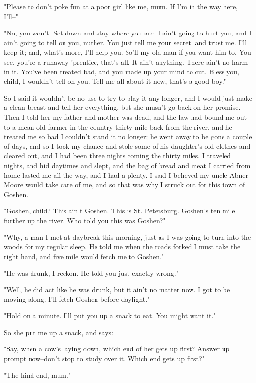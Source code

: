 "Please to don't poke fun at a poor girl like me, mum.  If I'm in the way
here, I'll--"

"No, you won't.  Set down and stay where you are.  I ain't going to hurt
you, and I ain't going to tell on you, nuther.  You just tell me your
secret, and trust me.  I'll keep it; and, what's more, I'll help you.
So'll my old man if you want him to.  You see, you're a runaway
'prentice, that's all.  It ain't anything.  There ain't no harm in it.
You've been treated bad, and you made up your mind to cut.  Bless you,
child, I wouldn't tell on you.  Tell me all about it now, that's a good
boy."

So I said it wouldn't be no use to try to play it any longer, and I would
just make a clean breast and tell her everything, but she musn't go back
on her promise.  Then I told her my father and mother was dead, and the
law had bound me out to a mean old farmer in the country thirty mile back
from the river, and he treated me so bad I couldn't stand it no longer;
he went away to be gone a couple of days, and so I took my chance and
stole some of his daughter's old clothes and cleared out, and I had been
three nights coming the thirty miles.  I traveled nights, and hid
daytimes and slept, and the bag of bread and meat I carried from home
lasted me all the way, and I had a-plenty.  I said I believed my uncle
Abner Moore would take care of me, and so that was why I struck out for
this town of Goshen.

"Goshen, child?  This ain't Goshen.  This is St. Petersburg.  Goshen's
ten mile further up the river.  Who told you this was Goshen?"

"Why, a man I met at daybreak this morning, just as I was going to turn
into the woods for my regular sleep.  He told me when the roads forked I
must take the right hand, and five mile would fetch me to Goshen."

"He was drunk, I reckon.  He told you just exactly wrong."

"Well, he did act like he was drunk, but it ain't no matter now.  I got
to be moving along.  I'll fetch Goshen before daylight."

"Hold on a minute.  I'll put you up a snack to eat.  You might want it."

So she put me up a snack, and says:

"Say, when a cow's laying down, which end of her gets up first?  Answer
up prompt now--don't stop to study over it.  Which end gets up first?"

"The hind end, mum."

